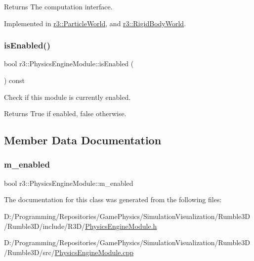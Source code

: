 \begin{DoxyReturn}{Returns}
The computation interface. 
\end{DoxyReturn}


Implemented in \mbox{\hyperlink{classr3_1_1_particle_world_a1e806bf89ec6445a54b9534f1efc081f}{r3\+::\+Particle\+World}}, and \mbox{\hyperlink{classr3_1_1_rigid_body_world_ac25b39a5b15666d99f42b68f29f8a97b}{r3\+::\+Rigid\+Body\+World}}.

\mbox{\label{classr3_1_1_physics_engine_module_add8b93ca3e3e3ec0ff045c15610119ea}} 
\subsubsection{\texorpdfstring{is\+Enabled()}{isEnabled()}}
{\footnotesize\ttfamily bool r3\+::\+Physics\+Engine\+Module\+::is\+Enabled (\begin{DoxyParamCaption}{ }\end{DoxyParamCaption}) const}



Check if this module is currently enabled. 

\begin{DoxyReturn}{Returns}
True if enabled, false otherwise. 
\end{DoxyReturn}


\subsection{Member Data Documentation}
\mbox{\label{classr3_1_1_physics_engine_module_a9697a77e77dc5dd5990b16876ad413bf}} 
\subsubsection{\texorpdfstring{m\+\_\+enabled}{m\_enabled}}
{\footnotesize\ttfamily bool r3\+::\+Physics\+Engine\+Module\+::m\+\_\+enabled\hspace{0.3cm}{\ttfamily [protected]}}



The documentation for this class was generated from the following files\+:\begin{DoxyCompactItemize}
\item 
D\+:/\+Programming/\+Repositories/\+Game\+Physics/\+Simulation\+Visualization/\+Rumble3\+D/\+Rumble3\+D/include/\+R3\+D/\mbox{\hyperlink{_physics_engine_module_8h}{Physics\+Engine\+Module.\+h}}\item 
D\+:/\+Programming/\+Repositories/\+Game\+Physics/\+Simulation\+Visualization/\+Rumble3\+D/\+Rumble3\+D/src/\mbox{\hyperlink{_physics_engine_module_8cpp}{Physics\+Engine\+Module.\+cpp}}\end{DoxyCompactItemize}
